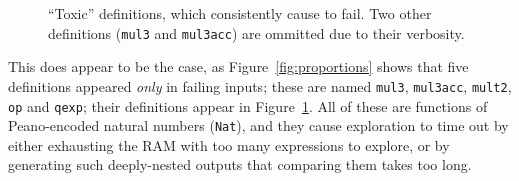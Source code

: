 \begin{figure}
  \iffalse
  \begin{verbatim}
    (define-fun-rec mul3 ((x Nat) (y Nat) (z Nat)) Nat
      (match x
        (case Z Z)                          ;; Base case for 0 * y * z
        (case (S x2)
          (match y
            (case Z Z)                      ;; Base case for x * 0 * z
            (case (S x3)
              (match z
                (case Z Z)                  ;; Base case for x * y * 0
                (case (S x4)
                  (match x2
                    (case Z
                      (match x3
                        (case Z
                          (match x4
                            (case Z (S Z))  ;; Base case for 1 * 1 * 1
                            (case (S x5)
                              (S (add3 (mul3 Z Z x4)
                                       (add3 (mul3 (S Z) Z x4)
                                             (mul3 Z (S Z) x4)
                                             (mul3 Z Z (S Z)))
                                       (add3 Z Z x4))))))
                        (case (S x6)
                          (S (add3 (mul3 Z x3 x4)
                                   (add3 (mul3 (S Z) x3 x4)
                                         (mul3 Z (S Z) x4)
                                         (mul3 Z x3 (S Z)))
                                   (add3 Z x3 x4))))))
                    (case (S x7)
                      (S (add3 (mul3 x2 x3 x4)
                               (add3 (mul3 (S Z) x3 x4)
                                     (mul3 x2 (S Z) x4)
                                     (mul3 x2 x3 (S Z)))
                               (add3 x2 x3 x4))))))))))))
  \end{verbatim}
  \fi
  \caption{``Toxic'' definitions, which consistently cause \qspec{} to fail. Two
    other definitions (\texttt{mul3} and \texttt{mul3acc}) are ommitted due to
    their verbosity.}
  \label{fig:faildefs}
\end{figure}

This does appear to be the case, as Figure~\ref{fig:proportions} shows that five
definitions appeared \emph{only} in failing inputs; these are named
\texttt{mul3}, \texttt{mul3acc}, \texttt{mult2}, \texttt{op} and \texttt{qexp};
their definitions appear in Figure~\ref{fig:faildefs}. All of these are
functions of Peano-encoded natural numbers (\texttt{Nat}), and they cause
exploration to time out by either exhausting the RAM with too many expressions
to explore, %
or by generating such deeply-nested outputs that comparing them takes too long.

